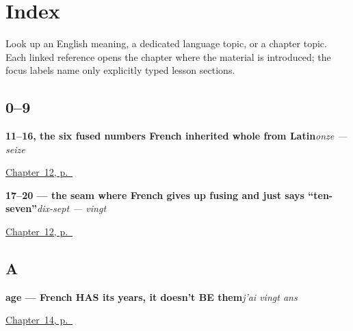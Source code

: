 
\chapter*{Index}

Look up an English meaning, a dedicated language topic, or a chapter topic. Each linked reference opens the chapter where the material is introduced; the focus labels name only explicitly typed lesson sections.

\section*{0--9}

\noindent\begin{minipage}[t]{\linewidth}
\raggedright
\textbf{11–16, the six fused numbers French inherited whole from Latin}\enspace\emph{onze — seize}\par
\footnotesize \hyperref[ch:numbers-11-20]{Chapter~12, p.~\pageref*{ch:numbers-11-20}}
\end{minipage}\par\smallskip

\noindent\begin{minipage}[t]{\linewidth}
\raggedright
\textbf{17–20 — the seam where French gives up fusing and just says \textquotedblleft{}ten-seven\textquotedblright{}}\enspace\emph{dix-sept — vingt}\par
\footnotesize \hyperref[ch:numbers-11-20]{Chapter~12, p.~\pageref*{ch:numbers-11-20}}
\end{minipage}\par\smallskip

\section*{A}

\noindent\begin{minipage}[t]{\linewidth}
\raggedright
\textbf{age — French HAS its years, it doesn't BE them}\enspace\emph{j'ai vingt ans}\par
\footnotesize \hyperref[ch:avoir-age]{Chapter~14, p.~\pageref*{ch:avoir-age}}
\end{minipage}\par\smallskip

